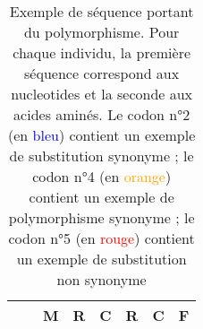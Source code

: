\documentclass[../main]{subfiles} %
\begin{document}
\begin{table}[]
\begin{tabular}{cccccccc}
                                            &                               & M    & \textbf{R}    & C    & \textbf{R}    & \textbf{C}   & F   \\
        \bottomrule
    \end{tabular}
    \caption{Exemple de séquence portant du polymorphisme. Pour chaque individu, la première séquence correspond aux \glspl{nucleotide} et la seconde aux acides aminés. Le \gls{codon} n°2 (en \textcolor{blue}{bleu}) contient un exemple de \gls{substitution} \gls{synonyme} ; le \gls{codon} n°4 (en \textcolor{orange}{orange}) contient un exemple de \gls{polymorphisme} \gls{synonyme} ; le \gls{codon} n°5 (en \textcolor{red}{rouge}) contient un exemple de \gls{substitution} non \gls{synonyme}
    }
    \label{tab:seqEx}
\end{table}

\end{document}
